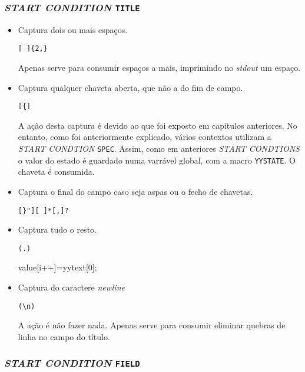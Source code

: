 \subsubsection{\emph{START CONDITION} \texttt{TITLE}}

\begin{itemize}
\item Captura dois ou mais espaços.
\begin{verbatim}
[ ]{2,}
\end{verbatim}

Apenas serve para consumir espaços a mais, imprimindo no \emph{stdout} um espaço.

\item Captura qualquer chaveta aberta, que não a do fim de campo.
\begin{verbatim}
[{]
\end{verbatim}

A ação desta captura é devido ao que foi exposto em capítulos anteriores. No entanto, como foi anteriormente explicado, vários contextos utilizam a \emph{START CONDTION} \texttt{SPEC}. Assim, como em anteriores \emph{START CONDTIONS} o valor do estado é guardado numa varrável global, com a macro \texttt{YYSTATE}. O chaveta é consumida.

\item Captura o final do campo caso seja aspas ou o fecho de chavetas.
\begin{verbatim}
[}"][ ]*[,]? 
\end{verbatim}

\item Captura tudo o resto.
\begin{verbatim}
(.)
\end{verbatim}
{value[i++]=yytext[0];}

\item Captura do caractere \emph{newline}
\begin{verbatim}
(\n)
\end{verbatim}

A ação é não fazer nada. Apenas serve para consumir eliminar quebras de linha no campo do título.


\end{itemize}

\subsubsection{\emph{START CONDITION} \texttt{FIELD}}

